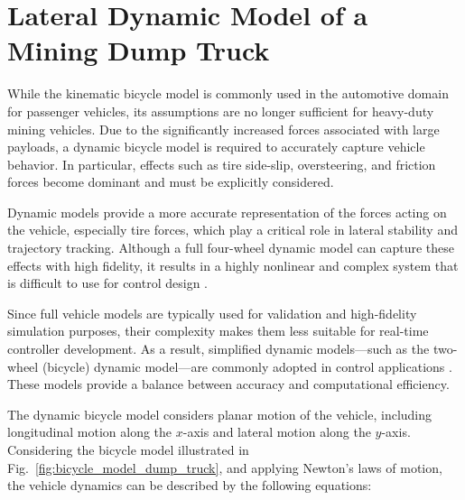 \documentclass{ifacconf}
\begin{document}
\section{Lateral Dynamic Model of a Mining Dump Truck}

While the kinematic bicycle model is commonly used in the automotive domain for passenger vehicles, its assumptions are no longer sufficient for heavy-duty mining vehicles. Due to the significantly increased forces associated with large payloads, a dynamic bicycle model is required to accurately capture vehicle behavior. In particular, effects such as tire side-slip, oversteering, and friction forces become dominant and must be explicitly considered.

Dynamic models provide a more accurate representation of the forces acting on the vehicle, especially tire forces, which play a critical role in lateral stability and trajectory tracking. Although a full four-wheel dynamic model can capture these effects with high fidelity, it results in a highly nonlinear and complex system that is difficult to use for control design \cite{refFullVehicleModel}.

Since full vehicle models are typically used for validation and high-fidelity simulation purposes, their complexity makes them less suitable for real-time controller development. As a result, simplified dynamic models—such as the two-wheel (bicycle) dynamic model—are commonly adopted in control applications \cite{refVehicleControlReview}. These models provide a balance between accuracy and computational efficiency.

The dynamic bicycle model considers planar motion of the vehicle, including longitudinal motion along the $x$-axis and lateral motion along the $y$-axis. Considering the bicycle model illustrated in Fig.~\ref{fig:bicycle_model_dump_truck}, and applying Newton’s laws of motion, the vehicle dynamics can be described by the following equations:
\end{document}
